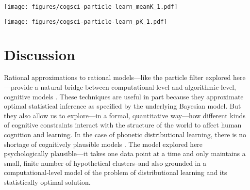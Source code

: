 \documentclass[10pt,letterpaper]{article}
\let\origfigure\figure
\let\endorigfigure\endfigure
\renewenvironment{figure}[1][2] {
    \expandafter\origfigure\expandafter[tbp]
} {
    \endorigfigure
}
\begin{document}
\begin{figure}
\hypertarget{fig:meanK}{%
\centering
\texttt{[image: figures/cogsci-particle-learn\_meanK\_1.pdf]}
\caption{The expected number of clusters for particle filter (colors,
95\% bootstrapped CIs over runs) and Gibbs sampler (gray horizontal
lines). Gibbs sampler is shown for 1,000 observations and 1,000
samples}\label{fig:meanK}
}
\end{figure}

\begin{figure*}
\hypertarget{fig:pK}{%
\centering
\texttt{[image: figures/cogsci-particle-learn\_pK\_1.pdf]}
\caption{The posterior probability assigned to each possible number of
components, as a function of the number of observations, number of
particles, and \(\alpha\). Blue vertical lines show the true number of
clusters \(K=2\).}\label{fig:pK}
}
\end{figure*}

\hypertarget{discussion}{%
\section{Discussion}\label{discussion}}

Rational approximations to rational models---like the particle filter
explored here---provide a natural bridge between computational-level and
algorithmic-level, cognitive models \autocite{Sanborn2010}. These
techniques are useful in part because they approximate optimal
statistical inference as specified by the underlying Bayesian model. But
they also allow us to explore---in a formal, quantitative way---how
different kinds of cognitive constraints interact with the structure of
the world to affect human cognition and learning. In the case of
phonetic distributional learning, there is no shortage of cognitively
plausible models \autocites[e.g.,][]{McMurray2009b}{Vallabha2007}. The
model explored here psychologically plausible---it takes one data point
at a time and only maintains a small, finite number of hypothetical
clusters--and also grounded in a computational-level model of the
problem of distributional learning and its statistically optimal
solution.
\end{document}
